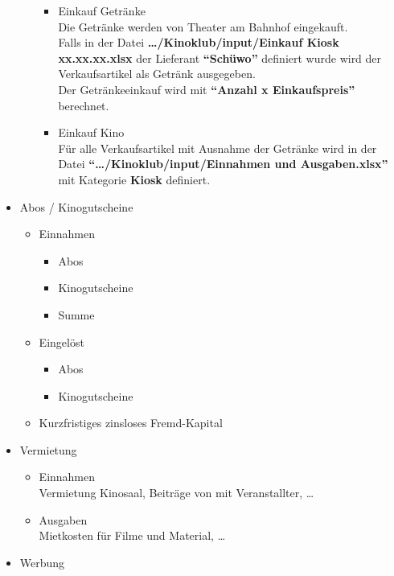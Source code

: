 \documentclass[
]{article}
\providecommand{\tightlist}{%
  \setlength{\itemsep}{0pt}\setlength{\parskip}{0pt}}
\begin{document}
\begin{itemize}
\begin{itemize}
    \begin{itemize}
    \tightlist
    \item
      Einkauf Getränke\\
      Die Getränke werden von Theater am Bahnhof eingekauft.\\
      Falls in der Datei \textbf{\ldots/Kinoklub/input/Einkauf Kiosk
      xx.xx.xx.xlsx} der Lieferant \textbf{``Schüwo''} definiert wurde
      wird der Verkaufsartikel als Getränk ausgegeben.\\
      Der Getränkeeinkauf wird mit \textbf{``Anzahl x Einkaufspreis''}
      berechnet.
    \item
      Einkauf Kino\\
      Für alle Verkaufsartikel mit Ausnahme der Getränke wird in der
      Datei \textbf{``\ldots/Kinoklub/input/Einnahmen und
      Ausgaben.xlsx''} ~ mit Kategorie \textbf{Kiosk} definiert.
    \end{itemize}
  \end{itemize}
\item
  Abos / Kinogutscheine

  \begin{itemize}
  \tightlist
  \item
    Einnahmen

    \begin{itemize}
    \tightlist
    \item
      Abos
    \item
      Kinogutscheine
    \item
      Summe
    \end{itemize}
  \item
    Eingelöst

    \begin{itemize}
    \tightlist
    \item
      Abos
    \item
      Kinogutscheine
    \end{itemize}
  \item
    Kurzfristiges zinsloses Fremd-Kapital
  \end{itemize}
\item
  Vermietung\\

  \begin{itemize}
  \tightlist
  \item
    Einnahmen\\
    Vermietung Kinosaal, Beiträge von mit Veranstallter, \ldots{}
  \item
    Ausgaben\\
    Mietkosten für Filme und Material, \ldots{}
  \end{itemize}
\item
  Werbung


\end{itemize}
\end{document}
